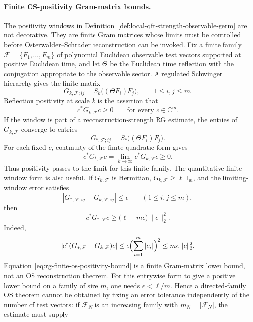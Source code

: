 \paragraph{Finite OS-positivity Gram-matrix bounds.}
The positivity windows in
Definition~\ref{def:local-qft-strength-observable-germ} are not decorative.
They are finite Gram matrices whose limits must be controlled before
Osterwalder--Schrader reconstruction can be invoked.  Fix a finite family
\(\mathcal F=\{F_1,\ldots,F_m\}\) of polynomial Euclidean observable test
vectors supported at positive Euclidean time, and let \(\Theta\) be the
Euclidean time reflection with the conjugation appropriate to the observable
sector.  A regulated Schwinger hierarchy gives the finite matrix
\begin{equation}
  G_{k,\mathcal F;i j}
  =
  S_k\bigl((\Theta F_i)F_j\bigr),
  \qquad
  1\le i,j\le m .
  \label{eq:rg-finite-os-gram-matrix}
\end{equation}
Reflection positivity at scale \(k\) is the assertion that
\[
  c^\ast G_{k,\mathcal F}c\ge0
  \qquad
  \text{for every }c\in\mathbb C^m .
\]
If the window is part of a reconstruction-strength RG estimate, the entries
of \(G_{k,\mathcal F}\) converge to entries
\[
  G_{\ast,\mathcal F;ij}
  =
  S_\ast\bigl((\Theta F_i)F_j\bigr).
\]
For each fixed \(c\), continuity of the finite quadratic form gives
\[
  c^\ast G_{\ast,\mathcal F}c
  =
  \lim_{k\to\infty}c^\ast G_{k,\mathcal F}c
  \ge0 .
\]
Thus positivity passes to the limit for this finite family.  The quantitative
finite-window form is also useful.  If \(G_{k,\mathcal F}\) is Hermitian,
\(G_{k,\mathcal F}\ge \ell\,1_m\), and the limiting-window error satisfies
\[
  |G_{\ast,\mathcal F;ij}-G_{k,\mathcal F;ij}|\le\epsilon
  \qquad
  (1\le i,j\le m),
\]
then
\begin{equation}
  c^\ast G_{\ast,\mathcal F}c
  \ge
  \bigl(\ell-m\epsilon\bigr)\|c\|_2^2 .
  \label{eq:rg-finite-os-positivity-bound}
\end{equation}
Indeed,
\[
  |c^\ast(G_{\ast,\mathcal F}-G_{k,\mathcal F})c|
  \le
  \epsilon\Bigl(\sum_{i=1}^m |c_i|\Bigr)^2
  \le
  m\epsilon\,\|c\|_2^2 .
\]
Equation~\eqref{eq:rg-finite-os-positivity-bound} is a finite
Gram-matrix lower bound, not an OS reconstruction theorem.  For this
entrywise form to give a positive lower bound on a family of size \(m\), one
needs \(\epsilon<\ell/m\).  Hence a directed-family OS theorem cannot be
obtained by fixing an error tolerance independently of the number of test
vectors: if \(\mathcal F_N\) is an increasing family with
\(m_N=|\mathcal F_N|\), the estimate must supply
